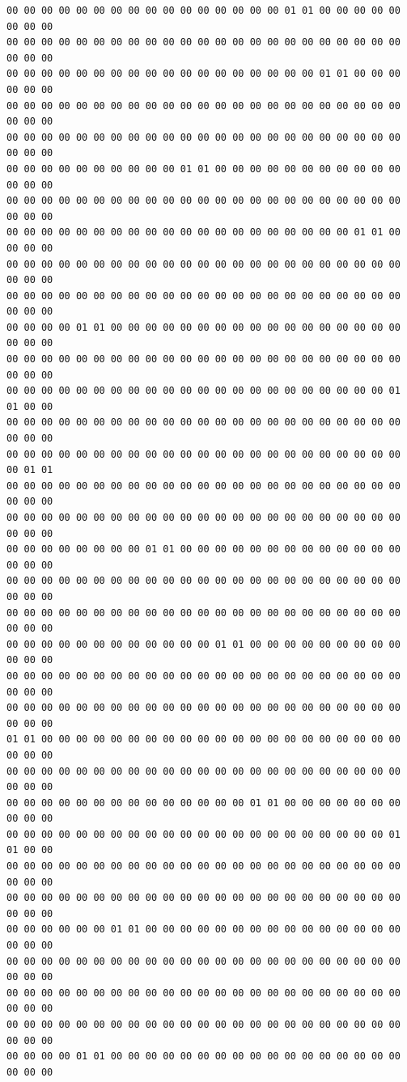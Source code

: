 \documentclass[a4paper]{article}
\begin{document}
\begin{verbatim}
00 00 00 00 00 00 00 00 00 00 00 00 00 00 00 00 01 01 00 00 00 00 00 00 00 00
00 00 00 00 00 00 00 00 00 00 00 00 00 00 00 00 00 00 00 00 00 00 00 00 00 00
00 00 00 00 00 00 00 00 00 00 00 00 00 00 00 00 00 00 01 01 00 00 00 00 00 00
00 00 00 00 00 00 00 00 00 00 00 00 00 00 00 00 00 00 00 00 00 00 00 00 00 00
00 00 00 00 00 00 00 00 00 00 00 00 00 00 00 00 00 00 00 00 00 00 00 00 00 00
00 00 00 00 00 00 00 00 00 00 01 01 00 00 00 00 00 00 00 00 00 00 00 00 00 00
00 00 00 00 00 00 00 00 00 00 00 00 00 00 00 00 00 00 00 00 00 00 00 00 00 00
00 00 00 00 00 00 00 00 00 00 00 00 00 00 00 00 00 00 00 00 01 01 00 00 00 00
00 00 00 00 00 00 00 00 00 00 00 00 00 00 00 00 00 00 00 00 00 00 00 00 00 00
00 00 00 00 00 00 00 00 00 00 00 00 00 00 00 00 00 00 00 00 00 00 00 00 00 00
00 00 00 00 01 01 00 00 00 00 00 00 00 00 00 00 00 00 00 00 00 00 00 00 00 00
00 00 00 00 00 00 00 00 00 00 00 00 00 00 00 00 00 00 00 00 00 00 00 00 00 00
00 00 00 00 00 00 00 00 00 00 00 00 00 00 00 00 00 00 00 00 00 00 01 01 00 00
00 00 00 00 00 00 00 00 00 00 00 00 00 00 00 00 00 00 00 00 00 00 00 00 00 00
00 00 00 00 00 00 00 00 00 00 00 00 00 00 00 00 00 00 00 00 00 00 00 00 01 01
00 00 00 00 00 00 00 00 00 00 00 00 00 00 00 00 00 00 00 00 00 00 00 00 00 00
00 00 00 00 00 00 00 00 00 00 00 00 00 00 00 00 00 00 00 00 00 00 00 00 00 00
00 00 00 00 00 00 00 00 01 01 00 00 00 00 00 00 00 00 00 00 00 00 00 00 00 00
00 00 00 00 00 00 00 00 00 00 00 00 00 00 00 00 00 00 00 00 00 00 00 00 00 00
00 00 00 00 00 00 00 00 00 00 00 00 00 00 00 00 00 00 00 00 00 00 00 00 00 00
00 00 00 00 00 00 00 00 00 00 00 00 01 01 00 00 00 00 00 00 00 00 00 00 00 00
00 00 00 00 00 00 00 00 00 00 00 00 00 00 00 00 00 00 00 00 00 00 00 00 00 00
00 00 00 00 00 00 00 00 00 00 00 00 00 00 00 00 00 00 00 00 00 00 00 00 00 00
01 01 00 00 00 00 00 00 00 00 00 00 00 00 00 00 00 00 00 00 00 00 00 00 00 00
00 00 00 00 00 00 00 00 00 00 00 00 00 00 00 00 00 00 00 00 00 00 00 00 00 00
00 00 00 00 00 00 00 00 00 00 00 00 00 00 01 01 00 00 00 00 00 00 00 00 00 00
00 00 00 00 00 00 00 00 00 00 00 00 00 00 00 00 00 00 00 00 00 00 01 01 00 00
00 00 00 00 00 00 00 00 00 00 00 00 00 00 00 00 00 00 00 00 00 00 00 00 00 00
00 00 00 00 00 00 00 00 00 00 00 00 00 00 00 00 00 00 00 00 00 00 00 00 00 00
00 00 00 00 00 00 01 01 00 00 00 00 00 00 00 00 00 00 00 00 00 00 00 00 00 00
00 00 00 00 00 00 00 00 00 00 00 00 00 00 00 00 00 00 00 00 00 00 00 00 00 00
00 00 00 00 00 00 00 00 00 00 00 00 00 00 00 00 00 00 00 00 00 00 00 00 00 00
00 00 00 00 00 00 00 00 00 00 00 00 00 00 00 00 00 00 00 00 00 00 00 00 00 00
00 00 00 00 01 01 00 00 00 00 00 00 00 00 00 00 00 00 00 00 00 00 00 00 00 00

\end{verbatim}
\end{document}
